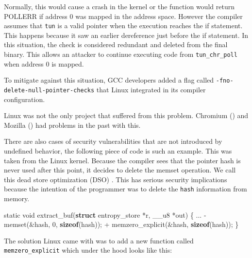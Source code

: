 \documentclass[
  a4paper,
]{report}
\newenvironment{Shaded}{}{}
\newcommand{\DataTypeTok}[1]{\textcolor[rgb]{0.56,0.13,0.00}{#1}}
\newcommand{\DecValTok}[1]{\textcolor[rgb]{0.25,0.63,0.44}{#1}}
\newcommand{\KeywordTok}[1]{\textcolor[rgb]{0.00,0.44,0.13}{\textbf{#1}}}
\newcommand{\NormalTok}[1]{#1}
\newcommand{\OperatorTok}[1]{\textcolor[rgb]{0.40,0.40,0.40}{#1}}
\begin{document}
Normally, this would cause a crash in the kernel or the function would
return POLLERR if address 0 was mapped in the address space. However the
compiler assumes that \texttt{tun} is a valid pointer when the execution
reaches the if statement. This happens because it saw an earlier
dereference just before the if statement. In this situation, the check
is considered redundant and deleted from the final binary. This allows
an attacker to continue executing code from \texttt{tun\_chr\_poll} when
address 0 is mapped.

To mitigate against this situation, GCC developers added a flag called
\texttt{-fno-delete-null-pointer-checks} that Linux integrated in its
compiler configuration.

Linux was not the only project that suffered from this problem. Chromium
() and Mozilla () had
problems in the past with this.

There are also cases of security vulnerabilities that are not introduced
by undefined behavior, the following piece of code is such an example.
This was taken from the Linux kernel. Because the compiler sees that the
pointer hash is never used after this point, it decides to delete the
memset operation. We call this dead store optimization (DSO)
. This has serious security implications
because the intention of the programmer was to delete the \texttt{hash}
information from memory.

\begin{Shaded}
\begin{Highlighting}[]
\DataTypeTok{static} \DataTypeTok{void}\NormalTok{ extract\_buf}\OperatorTok{(}\KeywordTok{struct}\NormalTok{ entropy\_store }\OperatorTok{*}\NormalTok{r}\OperatorTok{,}\NormalTok{ \_\_u8 }\OperatorTok{*}\NormalTok{out}\OperatorTok{)} \OperatorTok{\{}
  \OperatorTok{...}
  \OperatorTok{{-}}\NormalTok{ memset}\OperatorTok{(\&}\NormalTok{hash}\OperatorTok{,} \DecValTok{0}\OperatorTok{,} \KeywordTok{sizeof}\OperatorTok{(}\NormalTok{hash}\OperatorTok{));}
  \OperatorTok{+}\NormalTok{ memzero\_explicit}\OperatorTok{(\&}\NormalTok{hash}\OperatorTok{,} \KeywordTok{sizeof}\OperatorTok{(}\NormalTok{hash}\OperatorTok{));}
\OperatorTok{\}}
\end{Highlighting}
\end{Shaded}

The solution Linux came with was to add a new function called
\texttt{memzero\_explicit} which under the hood looks like this:
\end{document}
